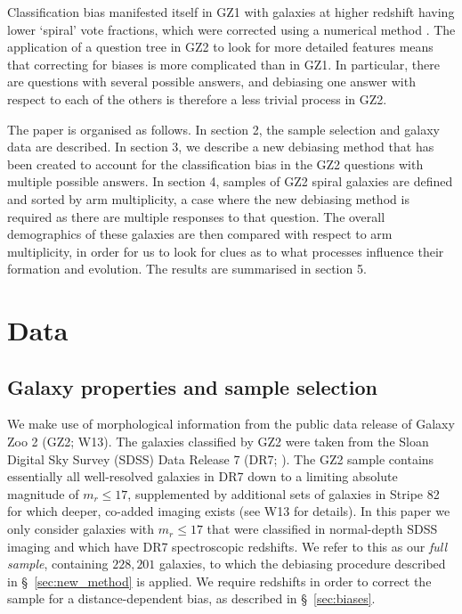 \documentclass[useAMS,usenatbib]{mn2e}
\begin{document}
Classification bias manifested itself in GZ1 with galaxies at higher redshift having lower `spiral' vote fractions, which were corrected using a numerical method \citep{Bamford_09}. The application of a question tree in GZ2 to look for more detailed features means that correcting for biases is more complicated than in GZ1. In particular, there are questions with several possible answers, and debiasing one answer with respect to each of the others is therefore a less trivial process in GZ2.

The paper is organised as follows. In section 2, the sample selection and galaxy data are described. In section 3, we describe a new debiasing method that has been created to account for the classification bias in the GZ2 questions with multiple possible answers. In section 4, samples of GZ2 spiral galaxies are defined and sorted by arm multiplicity, a case where the new debiasing method is required as there are multiple responses to that question. The overall demographics of these galaxies are then compared with respect to arm multiplicity, in order for us to look for clues as to what processes influence their formation and evolution. The results are summarised in section 5.
\section{Data}
\label{sec:data}
\subsection{Galaxy properties and sample selection}
\label{sec:sample}

We make use of morphological information from the public data release of Galaxy Zoo 2 (GZ2; W13). The galaxies classified by GZ2 were taken from the Sloan Digital Sky Survey (SDSS) Data Release 7 (DR7; \citet{Abazijian_09}). The GZ2 sample contains essentially all well-resolved galaxies in DR7 down to a limiting absolute magnitude of $m_r \leq 17$, supplemented by additional sets of galaxies in Stripe 82 for which deeper, co-added imaging exists (see W13 for details).  In this paper we only consider galaxies with $m_r \leq 17$ that were classified in normal-depth SDSS imaging and which have DR7 spectroscopic redshifts. We refer to this as our \textit{full sample}, containing $228,201$ galaxies, to which the debiasing procedure described in \S~\ref{sec:new_method} is applied. We require redshifts in order to correct the sample for a distance-dependent bias, as described in \S~\ref{sec:biases}.
\end{document}
